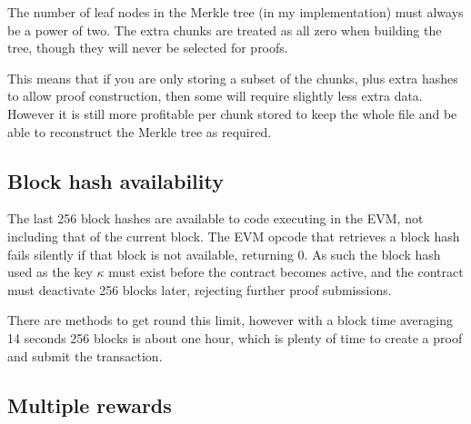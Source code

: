 \documentclass[12pt,a4paper,twoside,openright]{report}
\begin{document}
The number of leaf nodes in the Merkle tree (in my implementation) must always be a power of two.
The extra chunks are treated as all zero when building the tree, though they will never be selected for proofs.

This means that if you are only storing a subset of the chunks, plus extra hashes to allow proof construction,
then some will require slightly less extra data.
However it is still more profitable per chunk stored to keep the whole file and be able to reconstruct the Merkle tree as required.

%


\subsection{Block hash availability}

The last 256 block hashes are available to code executing in the EVM, not including that of the current block.
The EVM opcode that retrieves a block hash fails silently if that block is not available, returning 0.
As such the block hash used as the key $\kappa$ must exist before the contract becomes active,
and the contract must deactivate 256 blocks later, rejecting further proof submissions.

There are methods to get round this limit, however with a block time averaging 14 seconds
256 blocks is about one hour, which is plenty of time to create a proof and submit the transaction.

\subsection{Multiple rewards}
\end{document}
